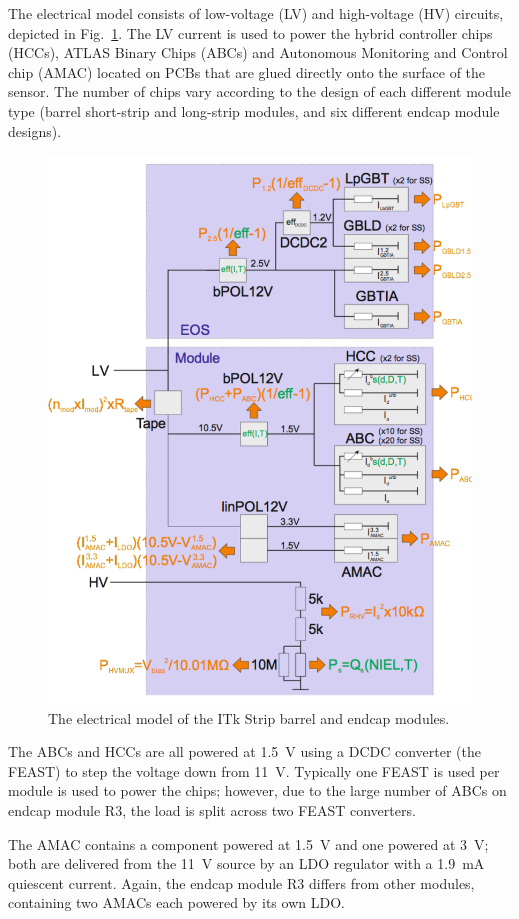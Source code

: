 
The electrical model consists of low-voltage (LV) and high-voltage (HV) circuits, depicted in
Fig.~\ref{electrical_model}. The LV current is used to power the hybrid controller chips (HCCs),
ATLAS Binary Chips (ABCs) and Autonomous Monitoring and Control chip (AMAC) located on PCBs that are
glued directly onto the surface of the sensor. The number of chips vary according to the design of
each different module type (barrel short-strip and long-strip modules, and six different endcap
module designs).

\begin{figure}[ht!]
\centering
\includegraphics[width=0.8\linewidth]{figures/electrical_model.pdf}
\caption{
The electrical model of the ITk Strip barrel and endcap modules.
}
\label{electrical_model}
\end{figure}

The ABCs and HCCs are all powered at 1.5~V using a DCDC converter (the FEAST) to step the voltage down
from 11~V. Typically one FEAST is used per module is used to power the chips; however, due to the large
number of ABCs on endcap module R3, the load is split across two FEAST converters.

The AMAC contains a component powered at 1.5~V and one powered at 3~V; both are delivered from the
11~V source by an LDO regulator with a 1.9~mA quiescent current.
Again, the endcap module R3 differs from other modules, containing two AMACs each powered by its own
LDO.

